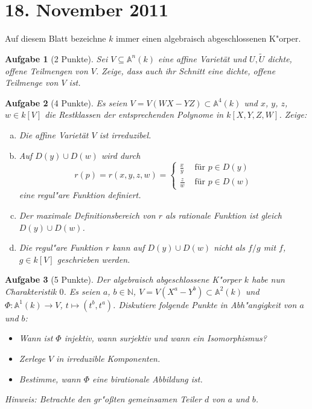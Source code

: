 \documentclass[a4paper, 12pt, numbers=noendperiod, chapterprefix=true]{scrbook}
\theoremstyle{break}
\newtheorem{Aufg}{Aufgabe}
\theoremstyle{nonumberbreak}
\theoremstyle{nonumberplain}
\newcommand{\N}{\mathbb{N}}
\newcommand{\A}{\mathbb{A}}
\newcommand{\Affine}{\mathbb{A}} %
\begin{document}
\newpage
\section{18. November 2011}
\setcounter{Aufg}{0}
\setcounter{Loes}{0}

Auf diesem Blatt bezeichne $k$ immer einen algebraisch abgeschlossenen K"orper.

\begin{Aufg}[2 Punkte]
Sei $V \subseteq \Affine^n(k)$ eine affine Variet\"at und $U,\tilde{U}$ dichte, offene Teilmengen von $V$. Zeige, dass auch ihr Schnitt eine dichte, offene Teilmenge von $V$ ist.
\end{Aufg}

\begin{Aufg}[4 Punkte]
Es seien $V = V(WX-YZ)\subset \Affine^4(k)$ und $x$, $y$, $z$, $w\in k[V]$ die Restklassen der entsprechenden Polynome in $k[X,Y,Z,W]$. Zeige:
\begin{enumerate}[a)]
	\item Die affine Varietät $V$ ist irreduzibel.
	\item Auf $D(y)\cup D(w)$ wird durch
		\[r(p) = r(x,y,z,w) = \begin{cases}
			\frac{x}{y} & \text{ für } p\in D(y)\\
			\frac{z}{w} & \text{ für } p\in D(w)
		\end{cases}\]
	eine regul"are Funktion definiert. 
	\item Der maximale Definitionsbereich von $r$ als rationale Funktion ist gleich $D(y)\cup D(w)$.
	\item Die regul"are Funktion $r$ kann auf $D(y)\cup D(w)$ nicht als $f/g$ mit $f$, $g\in k[V]$ geschrieben werden.
\end{enumerate}\end{Aufg}

\begin{Aufg}[5 Punkte]
Der algebraisch abgeschlossene K"orper $k$ habe nun Charakteristik $0$.
Es seien $a$, $b\in \N$, $V = V(X^a - Y^b)\subset \Affine^2(k)$ und $\Phi \colon\Affine^1(k)\to V$, $t\mapsto (t^b,t^a)$. Diskutiere folgende Punkte in Abh"angigkeit von $a$ und $b$:
\begin{itemize}
	\item Wann ist $\Phi$ injektiv, wann surjektiv und wann ein Isomorphismus? 
	\item Zerlege $V$ in irreduzible Komponenten.
	\item Bestimme, wann $\Phi$ eine birationale Abbildung ist.
\end{itemize}
\textit{Hinweis: Betrachte den gr"o\ss ten gemeinsamen Teiler $d$ von $a$ und $b$.}
\end{Aufg}
\end{document}
